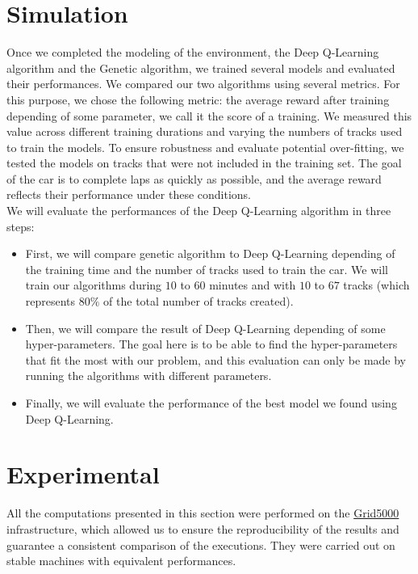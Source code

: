 \documentclass[11pt,a4paper]{article}
\newcommand{\mlist}[1]{\begin{itemize}[noitemsep,topsep=0pt]#1\end{itemize}}
\begin{document}
	
	\section*{Simulation}
Once we completed the modeling of the environment, the Deep Q-Learning algorithm and the Genetic algorithm, we trained several models and evaluated their performances. 
We compared our two algorithms using several metrics. 
For this purpose, we chose the following metric: the average reward after training depending of some parameter, we call it the score of a training. 
We measured this value across different training durations and varying the numbers of tracks used to train the models. 
To ensure robustness and evaluate potential over-fitting, we tested the models on tracks that were not included in the training set.
The goal of the car is to complete laps as quickly as possible, and the average reward reflects their performance under these conditions.
\\
We will evaluate the performances of the Deep Q-Learning algorithm in three steps: 
\mlist{
\item First, we will compare genetic algorithm to Deep Q-Learning depending of the training time and the number of tracks used to train the car. We will train our algorithms during $10$ to $60$ minutes and with $10$ to $67$ tracks (which represents $80\%$ of the total number of tracks created).
\item Then, we will compare the result of Deep Q-Learning depending of some hyper-parameters. The goal here is to be able to find the hyper-parameters that fit the most with our problem, and this evaluation can only be made by running the algorithms with different parameters.
\item Finally, we will evaluate the performance of the best model we found using Deep Q-Learning.
}

    \section*{Experimental}
All the computations presented in this section were performed on the \href{https://www.grid5000.fr}{Grid5000} infrastructure, which allowed us to ensure the reproducibility of the results and guarantee a consistent comparison of the executions. 
They were carried out on stable machines with equivalent performances.
\end{document}
